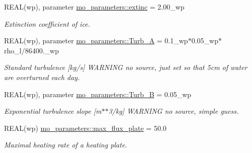 \begin{DoxyCompactItemize}
REAL(wp), parameter \hyperlink{namespacemo__parameters_a15c1092bdb139242bbe5ca253a9cfc70}{mo\_\-parameters::extinc} = 2.00\_\-wp
\begin{DoxyCompactList}\small\item\em Extinction coefficient of ice. \item\end{DoxyCompactList}\item 
REAL(wp), parameter \hyperlink{namespacemo__parameters_a42887cf935636d9eaf3fe6ad8cb3ee34}{mo\_\-parameters::Turb\_\-A} = 0.1\_\-wp$\ast$0.05\_\-wp$\ast$rho\_\-l/86400.\_\-wp
\begin{DoxyCompactList}\small\item\em Standard turbulence \mbox{[}kg/s\mbox{]} WARNING no source, just set so that 5cm of water are overturned each day. \item\end{DoxyCompactList}\item 
REAL(wp), parameter \hyperlink{namespacemo__parameters_a9fcd0db13d2536e79d192a96ad2d0712}{mo\_\-parameters::Turb\_\-B} = 0.05\_\-wp
\begin{DoxyCompactList}\small\item\em Exponential turbulence slope \mbox{[}m$\ast$$\ast$3/kg\mbox{]} WARNING no source, simple guess. \item\end{DoxyCompactList}\item 
REAL(wp) \hyperlink{namespacemo__parameters_a5bebd9cb4b53f939987065f7ebf4c8b7}{mo\_\-parameters::max\_\-flux\_\-plate} = 50.0
\begin{DoxyCompactList}\small\item\em Maximal heating rate of a heating plate. \item\end{DoxyCompactList}\end{DoxyCompactItemize}
